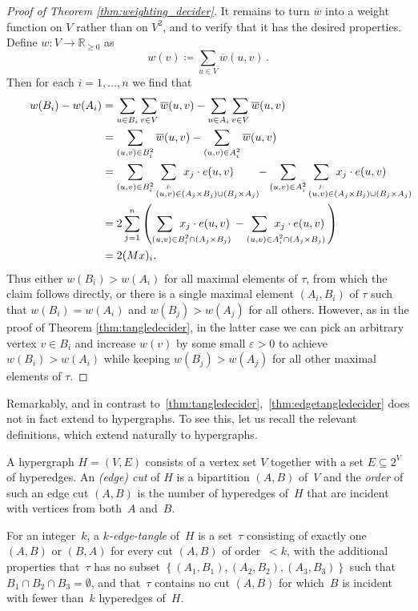 \documentclass[11pt]{article}
\theoremstyle{definition}
\newcommand{\R}{\mathbb{R}}
\newcommand{\menge}[1]{\left\{#1\right\}}
\begin{document}
\begin{proof}[Proof of Theorem \ref{thm:weighting_decider}]
It remains to turn $ \overline{w} $ into a weight function on $ V $ rather than on $ V^2 $, and to verify that it has the desired properties. Define $w\colon V\to\R_{\ge 0}$ as
\[ w(v) \coloneqq \sum_{u\in V} \overline{w}(u,v)\,. \]
Then for each $ i=1,\dots,n $ we find that
\[\begin{split}
w(B_i) - w(A_i) 
 &= \sum_{u \in B_i}\sum_{v\in V} \overline{w}(u,v) - \sum_{u\in A_i}\sum_{v\in V} \overline{w}(u,v) \\
 &= \sum_{(u,v) \in B_i^2} \overline{w}(u,v) - \sum_{(u,v) \in A_i^2} \overline{w}(u,v) \\
 &= \sum_{(u,v)\in B_i^2} \sum_{\overset{j:}{(u,v) \in \mathrlap{(A_j\times B_j)\cup(B_j\times A_j)}}} x_j \cdot e(u,v) \qquad - \sum_{(u,v) \in A_i^2} \sum_{\overset{j:}{(u,v) \in \mathrlap{(A_j\times B_j )\cup(B_j\times A_j)}}} x_j \cdot e(u,v) \\
&= 2\sum_{j=1}^n \left( \sum_{(u,v)\in\mathrlap{B_i^2 \cap (A_j\times B_j)}} x_j \cdot e(u,v) \; - \sum_{(u,v) \in \mathrlap{A_i^2 \cap (A_j\times B_j)}} x_j \cdot e(u,v) \; \right) \\
&=2(Mx)_i.
\end{split}\]
Thus either $w(B_i)>w(A_i)$ for all maximal elements of $\tau$, from which the claim follows directly, or there is a single maximal element $(A_i,B_i)$ of $\tau$ such that $w(B_i)=w(A_i)$ and $w(B_j)>w(A_j)$ for all others. However, as in the proof of Theorem \ref{thm:tangledecider}, in the latter case we can pick an arbitrary vertex $v\in B_i$ and increase $w(v)$ by some small $\varepsilon>0$ to achieve $w(B_i)>w(A_i)$ while keeping $w(B_j)>w(A_j)$ for all other maximal elements of $\tau$.
\end{proof}

Remarkably, and in contrast to~\cref{thm:tangledecider},~\cref{thm:edgetangledecider} does not in fact extend to hypergraphs.
To see this, let us recall the relevant definitions, which extend naturally to hypergraphs.

A hypergraph $H=(V,E)$ consists of a vertex set $V$ together with a set $E\subseteq 2^V$ of hyperedges. An \emph{(edge) cut} of $ H $ is a bipartition $ (A,B) $ of~$ V $ and the \emph{order} of such an edge cut $ (A,B) $ is the number of hyperedges of~$ H $ that are incident with vertices from both~$ A $ and~$ B $.

For an integer~$ k $, a \emph{$ k $-edge-tangle} of~$ H $ is a set~$ \tau $ consisting of exactly one $ (A,B) $ or $ (B,A) $ for every cut $ (A,B) $ of order~$ < k $, with the additional properties that~$ \tau $ has no subset $ \menge{(A_1,B_1), (A_2,B_2), (A_3,B_3)} $ such that $ B_1\cap B_2\cap B_3=\emptyset $, and that~$ \tau $ contains no cut $ (A,B) $ for which~$ B $ is incident with fewer than~$ k $ hyperedges of~$ H $.
\end{document}

